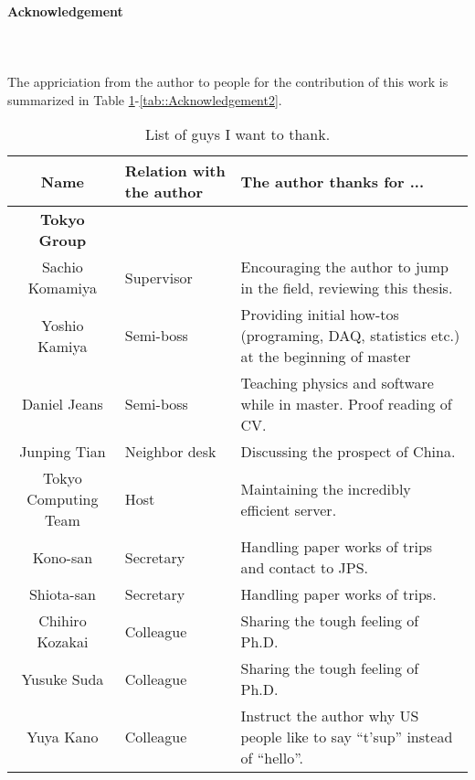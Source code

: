 \paragraph{\LARGE{Acknowledgement}} \mbox{\phantom{aaa}} \\
\mbox{\phantom{aaa}} \\
The appriciation from the author to people for the contribution of this work is summarized in Table \ref{tab::Acknowledgement1}-\ref{tab::Acknowledgement2}.

\begin{table}[h]    
  \centering
  \caption{List of guys I want to thank.}
  \label{tab::Acknowledgement1}
  \begin{tabularx}{\linewidth}{clX}
    \toprule
    Name               & Relation with the author        & The author thanks for ... \\
    \midrule
    \midrule
    \textbf{Tokyo Group} & & \\
    \midrule
    Sachio Komamiya    &   Supervisor                  &  Encouraging the author to jump in the field, reviewing this thesis. \\
    Yoshio Kamiya      &   Semi-boss                   &  Providing initial how-tos (programing, DAQ, statistics etc.) at the beginning of master  \\
    Daniel Jeans       &   Semi-boss                   &  Teaching physics and software while in master. Proof reading of CV.  \\
    Junping Tian       &   Neighbor desk               &  Discussing the prospect of China. \\
    Tokyo Computing Team &  Host       & Maintaining the incredibly efficient server. \\
    Kono-san           &   Secretary   & Handling paper works of trips and contact to JPS.  \\
    Shiota-san         &   Secretary   & Handling paper works of trips.  \\
    Chihiro Kozakai    &   Colleague   & Sharing the tough feeling of Ph.D.  \\
    Yusuke Suda        &   Colleague   & Sharing the tough feeling of Ph.D.  \\
    Yuya Kano          &   Colleague   & Instruct the author why US people like to say ``t'sup'' instead of ``hello''.  \\
    \bottomrule
  \end{tabularx}
\end{table}

